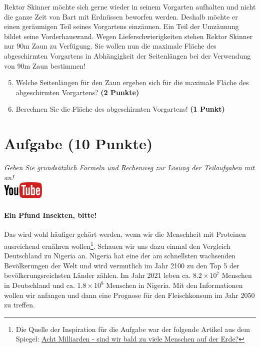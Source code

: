 \documentclass[a4paper, 9pt]{scrartcl}\usepackage[]{graphicx}\usepackage[]{xcolor}
\begin{document}
Rektor Skinner m{\"o}chte sich gerne wieder in seinem Vorgarten aufhalten und
nicht die ganze Zeit von Bart mit Erdn{\"u}ssen beworfen werden. Deshalb m{\"o}chte
er einen ger{\"a}umigen Teil seines Vorgartens einz{\"a}unen. Ein Teil der
Umz{\"a}unung bildet seine Vorderhauswand. Wegen Lieferschwierigkeiten stehen
Rektor Skinner nur 90m Zaun zu Verf{\"u}gung. Sie wollen nun die
maximale Fl{\"a}che des abgeschirmten Vorgartens in Abh{\"a}ngigkeit der
Seitenl{\"a}ngen bei der Verwendung von 90m Zaun bestimmen!

\begin{enumerate}
  \setcounter{enumi}{4}  
\item  Welche Seitenl{\"a}ngen f{\"u}r den Zaun ergeben sich f{\"u}r die
  maximale Fl{\"a}che des abgeschirmten Vorgartens? \textbf{(2 Punkte)}
\item Berechnen Sie die Fl{\"a}che des abgeschirmten Vorgartens! \textbf{(1
    Punkt)}
\end{enumerate}

 
\clearpage

\section{Aufgabe \hfill (10 Punkte)}

\textit{Geben Sie grunds{\"a}tzlich Formeln und Rechenweg zur L{\"o}sung der
  Teilaufgaben mit an!} \\[1Ex]

\hfill\href{https://youtu.be/OhyuH6hzEhY}{\includegraphics[width = 2cm]{img/youtube}} %
\hspace{2Ex}




\paragraph{Ein Pfund Insekten, bitte!} Das wird wohl h{\"a}ufiger geh{\"o}rt
werden, wenn wir die Menschheit mit Proteinen ausreichend ern{\"a}hren
wollen\footnote{Die Quelle der Inspiration f{\"u}r die Aufgabe war der folgende
  Artikel aus dem Spiegel:
  \href{https://www.spiegel.de/ausland/ueberbevoelkerung-acht-milliarden-sind-wir-bald-zu-viele-menschen-auf-der-erde-a-3f20c7bc-3d60-4440-9f52-eb338db207f5}{Acht
    Milliarden - sind wir bald zu viele Menschen auf der Erde?}}. Schauen
wir uns dazu einmal den Vergleich Deutschland zu Nigeria an. Nigeria hat
eine der am schnellsten wachsenden Bev{\"o}lkerungen der Welt und wird
vermutlich im Jahr 2100 zu den Top 5 der bev{\"o}lkerungsreichsten L{\"a}nder
z{\"a}hlen. Im Jahr 2021 leben ca. \ensuremath{8.2\times 10^{7}} Menschen in
Deutschland und ca. \ensuremath{1.8\times 10^{8}} Menschen in Nigeria. Mit den
Informationen wollen wir anfangen und dann eine Prognose f{\"u}r den
Fleischkonsum im Jahr 2050 zu treffen. \\ 
\end{document}
